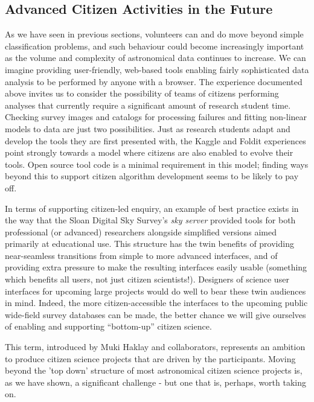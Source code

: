 \documentclass{ar2e}
\begin{document}
\subsection{Advanced Citizen Activities in the Future}

As we have seen in previous sections, volunteers can and do move beyond simple
classification problems, and such behaviour could become increasingly important
as the volume and complexity of astronomical data continues to increase.  We can
imagine providing user-friendly, web-based tools enabling  fairly sophisticated
data analysis to be performed by anyone with a browser. The experience
documented above invites us to consider the possibility of teams of citizens 
performing analyses that currently require a significant amount of research
student time.  Checking survey images and catalogs  for processing failures and
fitting non-linear models to data are just two possibilities. Just as research
students adapt and develop the tools they are first presented with, the Kaggle
and Foldit experiences point strongly towards a model where citizens are also
enabled to evolve their tools. Open source tool code is a minimal requirement in
this model; finding ways beyond this to support citizen algorithm development
seems to be likely to pay off.

In terms of supporting citizen-led enquiry, an example of best practice exists
in the way that the Sloan Digital Sky Survey's \emph{sky server} provided tools
for both professional (or advanced) researchers alongside simplified versions
aimed primarily at educational use. This structure has the twin benefits of
providing near-seamless transitions from simple to more advanced interfaces, and
of providing extra pressure to make the resulting interfaces easily usable 
(something which benefits all users, not just citizen scientists!). Designers of
science user interfaces for upcoming large projects would do well to bear these
twin audiences in mind. Indeed, the more citizen-accessible the interfaces to
the upcoming public wide-field survey databases can be made, the better chance
we will give ourselves of enabling and supporting ``bottom-up'' citizen
science.  

This term, introduced by Muki Haklay and collaborators, represents an ambition to produce
citizen science projects that are driven by the participants. Moving beyond the 'top down'
structure of most astronomical citizen science projects is, as we have shown, a significant
challenge - but one that is, perhaps, worth taking on. 
\end{document}
